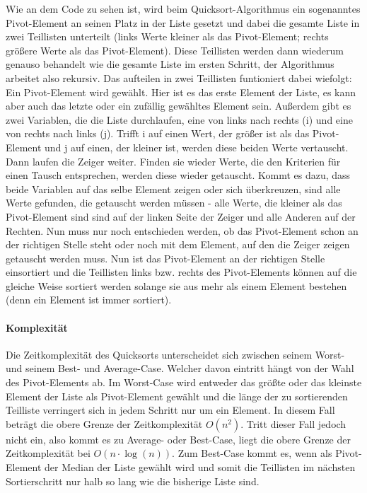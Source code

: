 \documentclass{article}
\begin{document}
	Wie an dem Code zu sehen ist, wird beim Quicksort-Algorithmus ein sogenanntes Pivot-Element an seinen Platz in der Liste gesetzt und dabei die gesamte Liste in zwei Teillisten unterteilt (links Werte kleiner als das Pivot-Element; rechts größere Werte als das Pivot-Element). Diese Teillisten werden dann wiederum genauso behandelt wie die gesamte Liste im ersten Schritt, der Algorithmus arbeitet also rekursiv. Das aufteilen in zwei Teillisten funtioniert dabei wiefolgt: Ein Pivot-Element wird gewählt. Hier ist es das erste Element der Liste, es kann aber auch das letzte oder ein zufällig gewähltes Element sein. Außerdem gibt es zwei Variablen, die die Liste durchlaufen, eine von links nach rechts (i) und eine von rechts nach links (j). Trifft i auf einen Wert, der größer ist als das Pivot-Element und j auf einen, der kleiner ist, werden diese beiden Werte vertauscht. Dann laufen die Zeiger weiter. Finden sie wieder Werte, die den Kriterien für einen Tausch entsprechen, werden diese wieder getauscht. Kommt es dazu, dass beide Variablen auf das selbe Element zeigen oder sich überkreuzen, sind alle Werte gefunden, die getauscht werden müssen - alle Werte, die kleiner als das Pivot-Element sind sind auf der linken Seite der Zeiger und alle Anderen auf der Rechten. Nun muss nur noch entschieden werden, ob das Pivot-Element schon an der richtigen Stelle steht oder noch mit dem Element, auf den die Zeiger zeigen getauscht werden muss. Nun ist das Pivot-Element an der richtigen Stelle einsortiert und die Teillisten links bzw. rechts des Pivot-Elements können auf die gleiche Weise sortiert werden solange sie aus mehr als einem Element bestehen (denn ein Element ist immer sortiert). 
	
	\paragraph{Komplexität}
	
	Die Zeitkomplexität des Quicksorts unterscheidet sich zwischen seinem Worst- und seinem Best- und Average-Case. Welcher davon eintritt hängt von der Wahl des Pivot-Elements ab. Im Worst-Case wird entweder das größte oder das kleinste Element der Liste als Pivot-Element gewählt und die länge der zu sortierenden Teilliste verringert sich in jedem Schritt nur um ein Element. In diesem Fall beträgt die obere Grenze der Zeitkomplexität $O(n^2)$. Tritt dieser Fall jedoch nicht ein, also kommt es zu Average- oder Best-Case, liegt die obere Grenze der Zeitkomplexität bei $O(n \cdot \log(n))$. Zum Best-Case kommt es, wenn als Pivot-Element der Median der Liste gewählt wird und somit die Teillisten im nächsten Sortierschritt nur halb so lang wie die bisherige Liste sind. 
	
\end{document}
